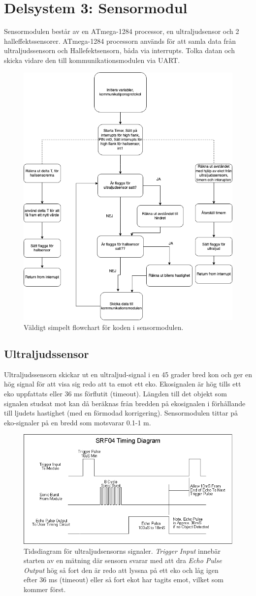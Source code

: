 \documentclass[10pt,oneside,swedish]{lips}
\begin{document}
\section{Delsystem 3: Sensormodul}
Sensormodulen består av en ATmega-1284 processor, en ultraljudsensor och 2 halleffektssensorer. ATmega-1284 processorn används för att samla data från ultraljudssensorn och Hallefektsensorn, båda via interrupts. Tolka datan och skicka vidare den till kommunikationsmodulen via UART.

\begin{figure}[htbp]
  \centering
  \includegraphics[width=.4\textwidth]{./Figures/SensormodulV2.drawio.png}
  \caption{Väldigt simpelt flowchart för koden i sensormodulen.}
  \label{fig:sensorflow}
\end{figure}

\subsection{Ultraljudssensor} \label{sec:ultraljud}
Ultraljudssensorn skickar ut en ultraljud-signal i en 45 grader bred kon och ger en hög signal för att visa sig redo att ta emot ett eko. Ekosignalen är hög tills ett eko uppfattats eller 36 ms förflutit (timeout). Längden till det objekt som signalen studsat mot kan då beräknas från bredden på ekosignalen i förhållande till ljudets hastighet (med en förmodad korrigering). Sensormodulen tittar på eko-signaler på en bredd som motsvarar 0.1-1 m.

\begin{figure}[htbp]
  \centering
  \includegraphics[width=.60\textwidth]{./Figures/srf04timing.png}
  \caption{Tidsdiagram för ultraljudsensorns signaler. \emph{Trigger Input} innebär starten av en mätning där sensorn svarar med att dra \emph{Echo Pulse Output} hög så fort den är redo att lyssna på ett eko och låg igen efter 36 ms (timeout) eller så fort ekot har tagits emot, vilket som kommer först.}
  \label{fig:us-timing}
\end{figure}
\end{document}
